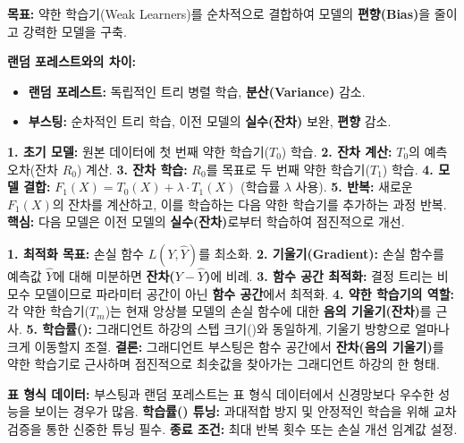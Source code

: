 \documentclass[11pt,a4paper]{book}
\theoremstyle{definition}
\begin{document}
\begin{tcolorbox}[summary, title={\textbf{부스팅 핵심 요약}}] %
\textbf{목표:} 약한 학습기(Weak Learners)를 순차적으로 결합하여 모델의 \textbf{편향(Bias)}을 줄이고 강력한 모델을 구축.

\textbf{랜덤 포레스트와의 차이:}
\begin{itemize}
    \item \textbf{랜덤 포레스트:} 독립적인 트리 병렬 학습, \textbf{분산(Variance)} 감소.
    \item \textbf{부스팅:} 순차적인 트리 학습, 이전 모델의 \textbf{실수(잔차)} 보완, \textbf{편향} 감소.
\end{itemize}
\end{tcolorbox}

\begin{tcolorbox}[infobox, title={\textbf{그래디언트 부스팅 작동 원리}}] %
\textbf{1. 초기 모델:} 원본 데이터에 첫 번째 약한 학습기($T_0$) 학습.
\textbf{2. 잔차 계산:} $T_0$의 예측 오차(잔차 $R_0$) 계산.
\textbf{3. 잔차 학습:} $R_0$를 목표로 두 번째 약한 학습기($T_1$) 학습.
\textbf{4. 모델 결합:} $F_1(X) = T_0(X) + \lambda \cdot T_1(X)$ (학습률 $\lambda$ 사용).
\textbf{5. 반복:} 새로운 $F_1(X)$의 잔차를 계산하고, 이를 학습하는 다음 약한 학습기를 추가하는 과정 반복.
\textbf{핵심:} 다음 모델은 이전 모델의 \textbf{실수(잔차)}로부터 학습하여 점진적으로 개선.
\end{tcolorbox}

\begin{tcolorbox}[warningbox, title={\textbf{그래디언트 하강(Gradient Descent)과의 연결}}] %
\textbf{1. 최적화 목표:} 손실 함수 $L(Y, \hat{Y})$를 최소화.
\textbf{2. 기울기(Gradient):} 손실 함수를 예측값 $\hat{Y}$에 대해 미분하면 \textbf{잔차($Y - \hat{Y}$)}에 비례.
\textbf{3. 함수 공간 최적화:} 결정 트리는 비모수 모델이므로 파라미터 공간이 아닌 \textbf{함수 공간}에서 최적화.
\textbf{4. 약한 학습기의 역할:} 각 약한 학습기($T_m$)는 현재 앙상블 모델의 손실 함수에 대한 \textbf{음의 기울기(잔차)}를 근사.
\textbf{5. 학습률(\texttt{\lambda}):} 그래디언트 하강의 스텝 크기(\texttt{\eta})와 동일하게, 기울기 방향으로 얼마나 크게 이동할지 조절.
\textbf{결론:} 그래디언트 부스팅은 함수 공간에서 \textbf{잔차(음의 기울기)}를 약한 학습기로 근사하며 점진적으로 최솟값을 찾아가는 그래디언트 하강의 한 형태.
\end{tcolorbox}

\begin{tcolorbox}[importantbox, title={\textbf{중요 사항}}] %
\textbf{표 형식 데이터:} 부스팅과 랜덤 포레스트는 표 형식 데이터에서 신경망보다 우수한 성능을 보이는 경우가 많음.
\textbf{학습률(\texttt{\lambda}) 튜닝:} 과대적합 방지 및 안정적인 학습을 위해 교차 검증을 통한 신중한 튜닝 필수.
\textbf{종료 조건:} 최대 반복 횟수 또는 손실 개선 임계값 설정.
\end{tcolorbox}
\end{document}
